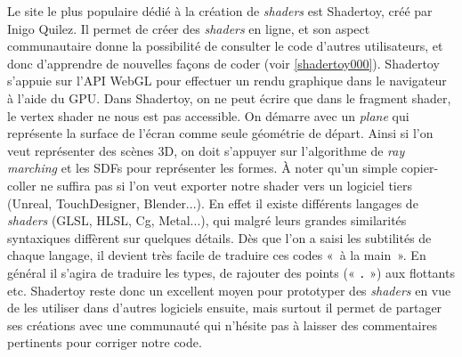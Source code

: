 Le site le plus populaire dédié à la création de \textit{shaders} est Shadertoy, créé par Inigo Quilez. Il permet de créer des \textit{shaders} en ligne, et son aspect communautaire donne la possibilité de consulter le code d'autres utilisateurs, et donc d'apprendre de nouvelles façons de coder (voir \ref{shadertoy000}). Shadertoy s'appuie sur l'API WebGL pour effectuer un rendu graphique dans le navigateur à l'aide du GPU. Dans Shadertoy, on ne peut écrire que dans le fragment shader, le vertex shader ne nous est pas accessible. On démarre avec un \textit{plane} qui représente la surface de l'écran comme seule géométrie de départ. Ainsi si l'on veut représenter des scènes 3D, on doit s'appuyer sur l'algorithme de \textit{ray marching} et les SDFs pour représenter les formes. À noter qu'un simple copier-coller ne suffira pas si l'on veut exporter notre shader vers un logiciel tiers (Unreal, TouchDesigner, Blender...). En effet il existe différents langages de \textit{shaders} (GLSL, HLSL, Cg, Metal...), qui malgré leurs grandes similarités syntaxiques diffèrent sur quelques détails. Dès que l'on a saisi les subtilités de chaque langage, il devient très facile de traduire ces codes «~à la main~». En général il s'agira de traduire les types, de rajouter des points (« \lstinline{.} ») aux flottants etc. Shadertoy reste donc un excellent moyen pour prototyper des \textit{shaders} en vue de les utiliser dans d'autres logiciels ensuite, mais surtout il permet de partager ses créations avec une communauté qui n'hésite pas à laisser des commentaires pertinents pour corriger notre code.

